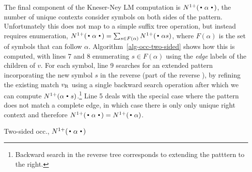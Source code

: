 The final component of the Kneser-Ney LM computation is
$\nlplus{\dotpatdot}$, the number of unique contexts consider symbols
on both sides of the pattern. 
Unfortunately this does not map to a simple suffix tree operation,
but instead requires enumeration,
$\nlplus{\dotpatdot} = \sum_{s \in F(\alpha)} \nlplus{\dotpat s}$, 
where $F(\alpha)$ is the set of symbols that can follow $\alpha$.
Algorithm~\ref{alg-occ-two-sided} shows how this is computed, with lines 7 and 8 enumerating $s \in F(\alpha)$ using the \emph{edge} labels of the children of $v$.
For each symbol, line 9 searches for an extended pattern incorporating the new symbol $s$ in the reverse \CSA (part of the reverse \CST), by refining the existing match $v_{\text{R}}$ using a single backward search operation after which we can compute $\nlplus{\patdot s}$.\footnote{Backward search in the reverse tree corresponds to extending the patttern to the right.}
Line 5 deals with the special case where the pattern does not match a complete edge, in which case there is only only unique right context and therefore $\nlplus{\dotpatdot} = \nlplus{\dotpat}$.

\begin{algorithm}[t]
  \caption{Two-sided occ., $\nlplus{\dotpatdot}$ 
    \label{alg:n1plusfb}}
\footnotesize
  \begin{algorithmic}[1]
        \Else
           \For{$\chf \gets \children{\tf}{\nf}$} 
            \EndFor
        \EndIf
      \State {}
    \EndFunction
  \end{algorithmic}
\label{alg-occ-two-sided}
\end{algorithm}

